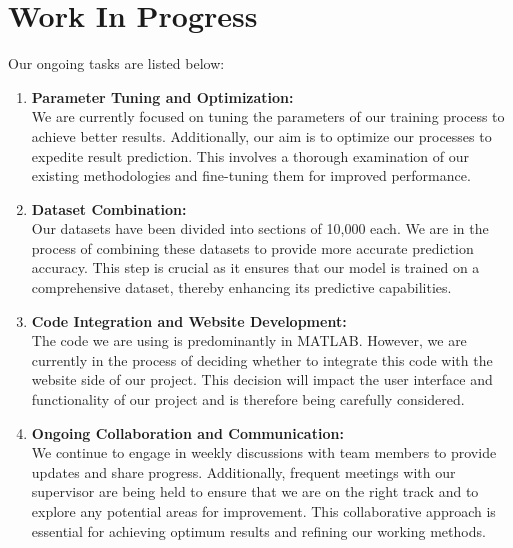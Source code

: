 \chapter{Work In Progress}
Our ongoing tasks are listed below:
\begin{enumerate}[label=\arabic*.]
    \item \textbf{Parameter Tuning and Optimization:} \\
    We are currently focused on tuning the parameters of our training process to achieve better results. Additionally, our aim is to optimize our processes to expedite result prediction. This involves a thorough examination of our existing methodologies and fine-tuning them for improved performance.
    
    \item \textbf{Dataset Combination:} \\
    Our datasets have been divided into sections of 10,000 each. We are in the process of combining these datasets to provide more accurate prediction accuracy. This step is crucial as it ensures that our model is trained on a comprehensive dataset, thereby enhancing its predictive capabilities.
    
    \item \textbf{Code Integration and Website Development:} \\
    The code we are using is predominantly in MATLAB. However, we are currently in the process of deciding whether to integrate this code with the website side of our project. This decision will impact the user interface and functionality of our project and is therefore being carefully considered.
    
    \item \textbf{Ongoing Collaboration and Communication:} \\
    We continue to engage in weekly discussions with team members to provide updates and share progress. Additionally, frequent meetings with our supervisor are being held to ensure that we are on the right track and to explore any potential areas for improvement. This collaborative approach is essential for achieving optimum results and refining our working methods.
\end{enumerate}